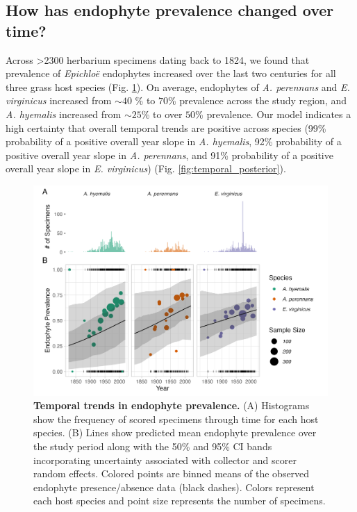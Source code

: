\documentclass[11pt]{article}
\begin{document}
\subsection*{How has endophyte prevalence changed over time?}
Across >2300 herbarium specimens dating back to 1824, we found that prevalence of \emph{Epichloë} endophytes increased over the last two centuries for all three grass host species (Fig. \ref{fig:temporal}). 
On average, endophytes of \emph{A. perennans} and \emph{E. virginicus} increased from $\sim 40$ \% to  $70$\% prevalence across the study region, and \emph{A. hyemalis} increased from $\sim 25$\% to over $50$\% prevalence.
Our model indicates a high certainty that overall temporal trends are positive across species (99\% probability of a positive overall year slope in \emph{A. hyemalis}, 92\% probability of a positive overall year slope in \emph{A. perennans}, and 91\% probability of a positive overall year slope in \emph{E. virginicus}) (Fig. \ref{fig:temporal_posterior}). 

\begin{figure}[H]
	\centering
	\includegraphics[width = \linewidth]{../Plots/year_plot.png}
	\caption[Temporal trends in endophyte prevalence.]{\textbf{Temporal trends in endophyte prevalence.} (A) Histograms show the frequency of scored specimens through time for each host species. (B) Lines show predicted mean endophyte prevalence over the study period along with the 50\%  and 95\% CI bands incorporating uncertainty associated with collector and scorer random effects. Colored points are binned means of the observed endophyte presence/absence data (black dashes). Colors represent each host species and point size represents the number of specimens.}
	\label{fig:temporal}
\end{figure}
\end{document}
